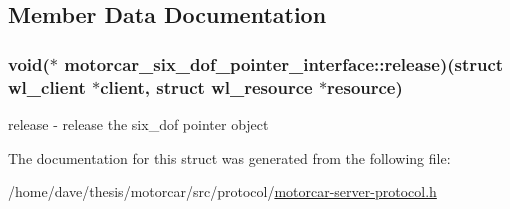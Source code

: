 \subsection{Member Data Documentation}
\hypertarget{structmotorcar__six__dof__pointer__interface_af0a50e3dcf962950e332433fc3242d83}{
\subsubsection[{release}]{\setlength{\rightskip}{0pt plus 5cm}void($\ast$ motorcar\-\_\-six\-\_\-dof\-\_\-pointer\-\_\-interface\-::release)(struct wl\-\_\-client $\ast$client, struct wl\-\_\-resource $\ast$resource)}}\label{structmotorcar__six__dof__pointer__interface_af0a50e3dcf962950e332433fc3242d83}
release -\/ release the six\-\_\-dof pointer object 

The documentation for this struct was generated from the following file\-:\begin{DoxyCompactItemize}
\item 
/home/dave/thesis/motorcar/src/protocol/\hyperlink{motorcar-server-protocol_8h}{motorcar-\/server-\/protocol.\-h}\end{DoxyCompactItemize}
